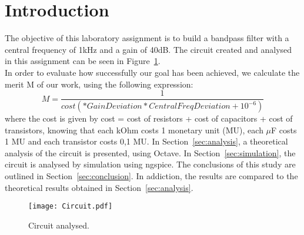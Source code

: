 \newpage
\section{Introduction}
\label{sec:introduction}

The objective of this laboratory assignment is to build a bandpass filter with a central frequency of 1kHz and a gain of 40dB.
The circuit created and analysed in this assignment can be seen in Figure~\ref{fig:Circuit}.\\
\noindent In order to evaluate how successfully our goal has been achieved, we calculate the merit M of our work, using the following expression:
\begin{equation}
M = \frac{1}{cost(*GainDeviation*CentralFreqDeviation + 10^{-6})}
  \label{eq:merit}
\end{equation}
where the cost is given by cost = cost of resistors + cost of capacitors + cost of transistors, knowing that each kOhm costs 1 monetary unit (MU), 
each $\mu$F costs 1 MU and each transistor costs 0,1 MU.
\noindent In Section~\ref{sec:analysis}, a theoretical analysis of the circuit is
presented, using Octave. In Section~\ref{sec:simulation}, the circuit is analysed by
simulation using ngspice. The conclusions of this study are outlined in
Section~\ref{sec:conclusion}. In addiction, the results are compared to the theoretical results obtained in Section~\ref{sec:analysis}.

\begin{figure}[h!] \centering
\texttt{[image: Circuit.pdf]}
\caption{Circuit analysed.}
\label{fig:Circuit}
\end{figure}

